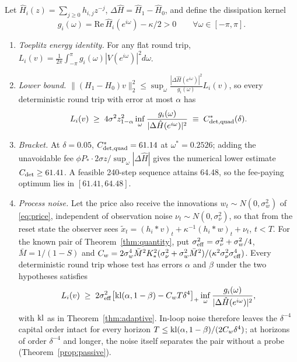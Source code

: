 \begin{theorem}\label{thm:spectral}
Let $\hat H_i(z)=\sum_{j\ge0}h_{i,j}z^{-j}$, $\Delta\hat H=\hat H_1-\hat H_0$, and define the dissipation kernel
\begin{equation}\label{eq:gdiss}
g_i(\omega)=\mathrm{Re}\,\hat H_i(e^{i\omega})-\kappa/2>0\qquad\forall\omega\in[-\pi,\pi].
\end{equation}
\begin{enumerate}[label=(\roman*)]
\item \emph{Toeplitz energy identity.} For any flat round trip, $L_i(v)=\frac1{2\pi}\int_{-\pi}^{\pi}g_i(\omega)|V(e^{i\omega})|^2d\omega$.
\item \emph{Lower bound.} $\|(H_1-H_0)v\|_2^2\le\sup_\omega\frac{|\Delta\hat H(e^{i\omega})|^2}{g_i(\omega)}L_i(v)$, so every deterministic round trip with error at most $\alpha$ has
\begin{equation}\label{eq:Cdet}
L_i(v)\;\ge\;4\sigma^2z_{1-\alpha}^2\inf_\omega\frac{g_i(\omega)}{|\Delta\hat H(e^{i\omega})|^2}\;\equiv\;C^*_{\rm det,quad}(\delta).
\end{equation}
\item \emph{Bracket.} At $\delta=0.05$, $C^*_{\rm det,quad}=61.14$ at $\omega^*=0.2526$; adding the unavoidable fee $\phi P_*\cdot2\sigma z/\sup_\omega|\Delta\hat H|$ gives the numerical lower estimate $C_{\rm det}\ge61.41$. A feasible 240-step sequence attains 64.48, so the fee-paying optimum lies in $[61.41,64.48]$.
\item \emph{Process noise.} Let the price also receive the innovations $w_t\sim N(0,\sigma_w^2)$ of \eqref{eq:price}, independent of observation noise $\nu_t\sim N(0,\sigma_\nu^2)$, so that from the reset state the observer sees $\tilde x_t=(h_i*v)_t+\kappa^{-1}(h_i*w)_t+\nu_t$, $t<T$. For the known pair of Theorem~\ref{thm:quantity}, put $\sigma_{\rm eff}^2=\sigma_\nu^2+\sigma_w^2/4$, $\bar M=1/(1-S)$ and $C_w=2\sigma_w^4\bar M^2K_*^2(\sigma_\nu^2+\sigma_w^2\bar M^2)/(\kappa^2\sigma_\nu^2\sigma_{\rm eff}^4)$. Every deterministic round trip whose test has errors $\alpha$ and $\beta$ under the two hypotheses satisfies
\begin{equation}\label{eq:Cnoise}
L_i(v)\;\ge\;2\sigma_{\rm eff}^2\bigl[{\rm kl}(\alpha,1-\beta)-C_wT\delta^4\bigr]_+\inf_\omega\frac{g_i(\omega)}{|\Delta\hat H(e^{i\omega})|^2},
\end{equation}
with ${\rm kl}$ as in Theorem~\ref{thm:adaptive}. In-loop noise therefore leaves the $\delta^{-4}$ capital order intact for every horizon $T\le{\rm kl}(\alpha,1-\beta)/(2C_w\delta^4)$; at horizons of order $\delta^{-4}$ and longer, the noise itself separates the pair without a probe (Theorem~\ref{prop:passive}).
\end{enumerate}
\end{theorem}

